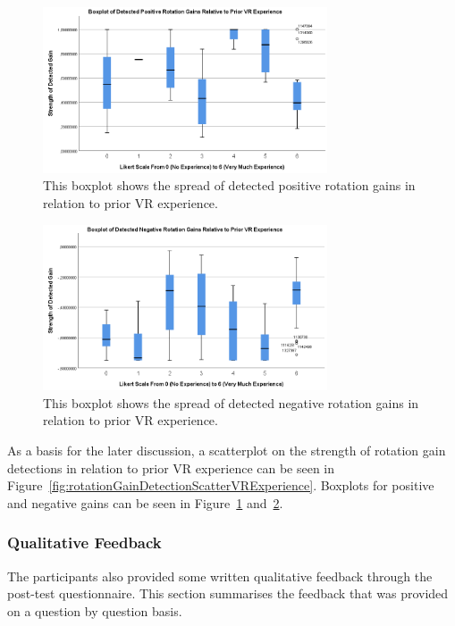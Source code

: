 \begin{figure}[tbph]
    \centering
    \includegraphics[width=0.75\textwidth]{figures/graphs/PosRotDetectionsByVRExperience.png}
    \caption[Boxplot on Detected Positive Rotation Gains by VR Experience]{This boxplot shows the spread of detected positive rotation gains in relation to prior VR experience.}
    \label{fig:posRotDetectionBoxplotVRExperience}
\end{figure}

\begin{figure}[tbph]
    \centering
    \includegraphics[width=0.75\textwidth]{figures/graphs/NegRotDetectionsByVRExperience.png}
    \caption[Boxplot on Detected Negative Rotation Gains by VR Experience]{This boxplot shows the spread of detected negative rotation gains in relation to prior VR experience.}
    \label{fig:negRotDetectionBoxplotVRExperience}
\end{figure}

As a basis for the later discussion, a scatterplot on the strength of rotation gain detections in relation to prior VR experience can be seen in Figure~\ref{fig:rotationGainDetectionScatterVRExperience}. Boxplots for positive and negative gains can be seen in Figure~\ref{fig:posRotDetectionBoxplotVRExperience} and~\ref{fig:negRotDetectionBoxplotVRExperience}.


\subsubsection{Qualitative Feedback}
The participants also provided some written qualitative feedback through the post-test questionnaire. This section summarises the feedback that was provided on a question by question basis. 

